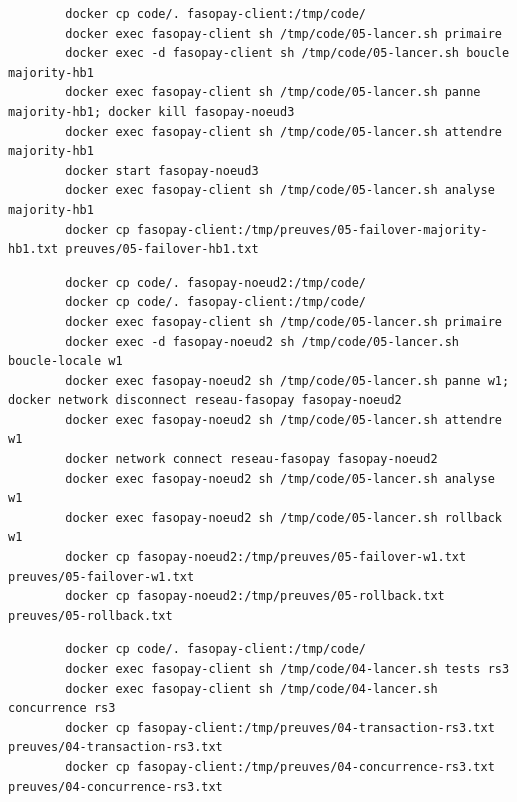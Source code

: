 \documentclass[11pt,a4paper]{article}
\begin{document}
	\begin{lstlisting}
		docker cp code/. fasopay-client:/tmp/code/
		docker exec fasopay-client sh /tmp/code/05-lancer.sh primaire
		docker exec -d fasopay-client sh /tmp/code/05-lancer.sh boucle majority-hb1
		docker exec fasopay-client sh /tmp/code/05-lancer.sh panne majority-hb1; docker kill fasopay-noeud3
		docker exec fasopay-client sh /tmp/code/05-lancer.sh attendre majority-hb1
		docker start fasopay-noeud3
		docker exec fasopay-client sh /tmp/code/05-lancer.sh analyse majority-hb1
		docker cp fasopay-client:/tmp/preuves/05-failover-majority-hb1.txt preuves/05-failover-hb1.txt
	\end{lstlisting}
	\begin{lstlisting}
		docker cp code/. fasopay-noeud2:/tmp/code/
		docker cp code/. fasopay-client:/tmp/code/
		docker exec fasopay-client sh /tmp/code/05-lancer.sh primaire
		docker exec -d fasopay-noeud2 sh /tmp/code/05-lancer.sh boucle-locale w1
		docker exec fasopay-noeud2 sh /tmp/code/05-lancer.sh panne w1; docker network disconnect reseau-fasopay fasopay-noeud2
		docker exec fasopay-noeud2 sh /tmp/code/05-lancer.sh attendre w1
		docker network connect reseau-fasopay fasopay-noeud2
		docker exec fasopay-noeud2 sh /tmp/code/05-lancer.sh analyse w1
		docker exec fasopay-noeud2 sh /tmp/code/05-lancer.sh rollback w1
		docker cp fasopay-noeud2:/tmp/preuves/05-failover-w1.txt preuves/05-failover-w1.txt
		docker cp fasopay-noeud2:/tmp/preuves/05-rollback.txt preuves/05-rollback.txt
	\end{lstlisting}
	\begin{lstlisting}
		docker cp code/. fasopay-client:/tmp/code/
		docker exec fasopay-client sh /tmp/code/04-lancer.sh tests rs3
		docker exec fasopay-client sh /tmp/code/04-lancer.sh concurrence rs3
		docker cp fasopay-client:/tmp/preuves/04-transaction-rs3.txt preuves/04-transaction-rs3.txt
		docker cp fasopay-client:/tmp/preuves/04-concurrence-rs3.txt preuves/04-concurrence-rs3.txt
	\end{lstlisting}
\end{document}
